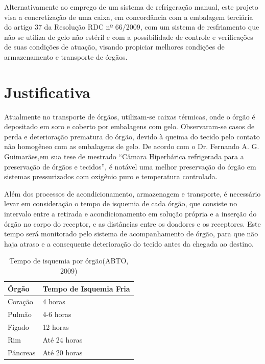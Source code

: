 Alternativamente ao emprego de um sistema de refrigeração manual, este projeto visa a concretização de uma caixa, em concordância com a embalagem terciária do artigo 37 da Resolução RDC nº 66/2009, com um sistema de resfriamento que não se utiliza de gelo não estéril e com a possibilidade de controle e verificações de suas condições de atuação, visando propiciar melhores condições de armazenamento e transporte de órgãos.


\section{Justificativa}

Atualmente no transporte de órgãos, utilizam-se caixas térmicas, onde o órgão é depositado em soro e coberto por embalagens com gelo. Observaram-se casos de perda e deterioração prematura do órgão, devido à queima do tecido pelo contato não homogêneo com as embalagens de gelo. De acordo com o Dr. Fernando A. G. Guimarães,em sua tese de mestrado “Câmara Hiperbárica refrigerada para a preservação de órgãos e tecidos”, é notável uma melhor preservação do órgão em sistemas pressurizados com oxigênio puro e temperatura controlada.

Além dos processos de acondicionamento, armazenagem e transporte, é necessário levar em consideração o tempo de isquemia de cada órgão, que consiste no intervalo entre a retirada e acondicionamento em solução própria e a inserção do órgão no corpo do receptor,  e as distâncias entre os doadores e os receptores. Este tempo será monitorado pelo sistema de acompanhamento de órgão, para que não haja atraso e a consequente deterioração do tecido antes da chegada ao destino.


\begin{table}[h!]
\centering
\begin{tabular}{|l|l|}
\hline
\textbf{Órgão} & \textbf{Tempo de Isquemia Fria} \\ \hline
Coração        & 4 horas                         \\ \hline
Pulmão         & 4-6 horas                       \\ \hline
Fígado         & 12 horas                        \\ \hline
Rim            & Até 24 horas                    \\ \hline
Pâncreas       & Até 20 horas                    \\ \hline
\end{tabular}
\caption{Tempo de isquemia por órgão(ABTO, 2009)}\label{isquemia_orgaos}
\end{table}

